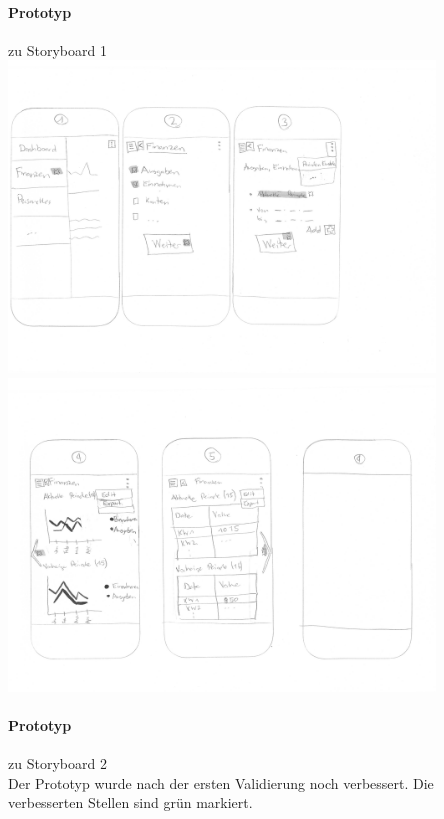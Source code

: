 \documentclass[a4paper]{scrreprt}
\begin{document}
\paragraph{Prototyp } zu Storyboard 1\\
\includegraphics[width=0.85\textwidth]{storyboards_personas_prototypes/iteration3/sidlm3_storyboard2_prototype1_1.png}\\
\includegraphics[width=0.85\textwidth]{storyboards_personas_prototypes/iteration3/sidlm3_storyboard2_prototype1_2.png}

\paragraph{Prototyp } zu Storyboard 2\\


Der Prototyp wurde nach der ersten Validierung noch verbessert. Die verbesserten Stellen sind grün markiert.
\end{document}
